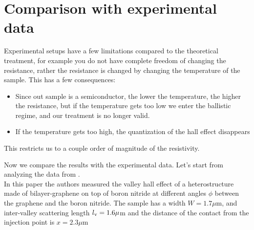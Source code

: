 \section{Comparison with experimental data}
Experimental setups have a few limitations compared to the theoretical treatment, for example you do not have complete freedom of changing the resistance, rather the resistance is changed by changing the temperature of the sample.
This has a few consequences: 
\begin{itemize}
    \item Since out sample is a semiconductor, the lower the temperature, the higher the resistance, but if the temperature gets too low we enter the ballistic regime, and our treatment is no longer valid.
    \item If the temperature gets too high, the quantization of the hall effect disappears
\end{itemize}
This restricts us to a couple order of magnitude of the resistivity.

Now we compare the results with the experimental data. Let's start from analyzing the data from  \cite{rebecca2022moirè}.\\
In this paper the authors measured the valley hall effect of a heterostructure made of bilayer-graphene on top of boron nitride at different angles $\phi$ between the graphene and the boron nitride. The sample has a width $W=1.7\mu$m, and inter-valley scattering length $l_{\textrm v}=1.6\mu$m and the distance of the contact from the injection point is $x=2.3\mu$m

